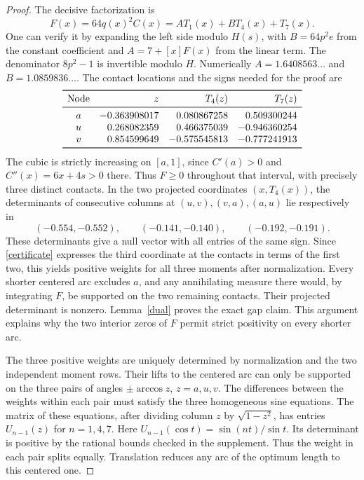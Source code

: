\documentclass[10pt]{article}
\begin{document}
\begin{proof}
The decisive factorization is
\begin{equation}\label{certificate}
 F(x)=64q(x)^2C(x)=A T_1(x)+B T_4(x)+T_7(x).
\end{equation}
One can verify it by expanding the left side modulo $H(s)$, with $B=64p^2e$ from the constant coefficient and $A=7+[x]F(x)$ from the linear term. The denominator $8p^2-1$ is invertible modulo $H$. Numerically $A=1.6408563\ldots$ and $B=1.0859836\ldots$.
The contact locations and the signs needed for the proof are
\[
\begin{array}{crrr}
\toprule
 \text{Node} & z & T_4(z) & T_7(z)\\
\midrule
 a & -0.363908017 &  0.080867258 &  0.509300244\\
 u &  0.268082359 &  0.466375039 & -0.946360254\\
 v &  0.854599649 & -0.575545813 & -0.777241913\\
\bottomrule
\end{array}
\]
The cubic is strictly increasing on $[a,1]$, since $C'(a)>0$ and $C''(x)=6x+4s>0$ there. Thus $F\ge0$ throughout that interval, with precisely three distinct contacts. In the two projected coordinates $(x,T_4(x))$, the determinants of consecutive columns at $(u,v),(v,a),(a,u)$ lie respectively in
\[
 (-0.554,-0.552),\qquad(-0.141,-0.140),\qquad(-0.192,-0.191).
\]
These determinants give a null vector with all entries of the same sign. Since \eqref{certificate} expresses the third coordinate at the contacts in terms of the first two, this yields positive weights for all three moments after normalization. Every shorter centered arc excludes $a$, and any annihilating measure there would, by integrating $F$, be supported on the two remaining contacts. Their projected determinant is nonzero. Lemma~\ref{dual} proves the exact gap claim. This argument explains why the two interior zeros of $F$ permit strict positivity on every shorter arc.

The three positive weights are uniquely determined by normalization and the two independent moment rows. Their lifts to the centered arc can only be supported on the three pairs of angles $\pm\arccos z$, $z=a,u,v$. The differences between the weights within each pair must satisfy the three homogeneous sine equations. The matrix of these equations, after dividing column $z$ by $\sqrt{1-z^2}$, has entries $U_{n-1}(z)$ for $n=1,4,7$. Here $U_{n-1}(\cos t)=\sin(nt)/\sin t$. Its determinant is positive by the rational bounds checked in the supplement. Thus the weight in each pair splits equally. Translation reduces any arc of the optimum length to this centered one.


\end{proof}
\end{document}
